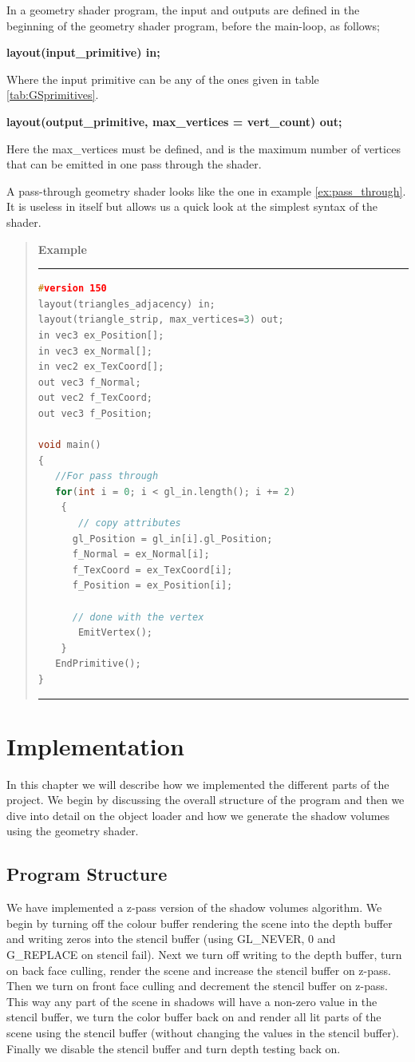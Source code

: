 \documentclass[a4paper, 12pt]{article}
\newcounter{examplecounter}
\newenvironment{example}{\begin{quote}%
    \refstepcounter{examplecounter}%
  \textbf{Example \arabic{examplecounter}}%
  \quad
}{%
\end{quote}%
}
\begin{document}
In a geometry shader program, the input and outputs are defined in the beginning of the geometry shader program, before the main-loop, as follows;
\begin{center}
\textbf{layout(input\_primitive​) in;}
\end{center}
Where the input primitive can be any of the ones given in table \ref{tab:GSprimitives}. 
\begin{center}
\textbf{layout(output\_primitive​, max\_vertices = vert\_count​) out;}
\end{center}
Here the max\_vertices must be defined, and is the maximum number of vertices that can be emitted in one pass through the shader.

A pass-through geometry shader looks like the one in example \ref{ex:pass_through}. It is useless in itself but allows us a quick look at the simplest syntax of the shader. 

\begin{example}\label{ex:pass_through}
\hrule
\begin{lstlisting}[language=c]
#version 150 
layout(triangles_adjacency) in;
layout(triangle_strip, max_vertices=3) out;
in vec3 ex_Position[];
in vec3 ex_Normal[];
in vec2 ex_TexCoord[];
out vec3 f_Normal;
out vec2 f_TexCoord;	     
out vec3 f_Position;

void main()
{
   //For pass through
   for(int i = 0; i < gl_in.length(); i += 2)
    {
       // copy attributes
      gl_Position = gl_in[i].gl_Position;
      f_Normal = ex_Normal[i];
      f_TexCoord = ex_TexCoord[i]; 
      f_Position = ex_Position[i];
 
      // done with the vertex
       EmitVertex();
    }
   EndPrimitive();
}
\end{lstlisting}
\hrule
\end{example}

\section{Implementation}
In this chapter we will describe how we implemented the different parts of the project. We begin by discussing the overall structure of the program and then we dive into detail on the object loader and how we generate the shadow volumes using the geometry shader.
\subsection{Program Structure}
We have implemented a z-pass version of the shadow volumes algorithm. We begin
by turning off the colour buffer rendering the scene into the depth buffer and
writing zeros into the stencil buffer (using GL\_NEVER, 0 and G\_REPLACE on
stencil fail). Next we turn off writing to the depth buffer, turn on back face
culling, render the scene and increase the stencil buffer on z-pass. Then we
turn on front face culling and decrement the stencil buffer on z-pass. This way
any part of the scene in shadows will have a non-zero value in the stencil
buffer, we turn the color buffer back on and render all lit parts of the scene
using the stencil buffer (without changing the values in the stencil buffer).
Finally we disable the stencil buffer and turn depth testing back on.
\end{document}
